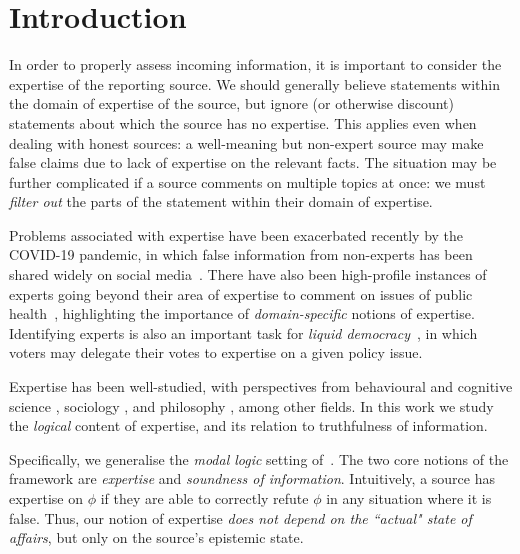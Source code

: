 \section{Introduction}

In order to properly assess incoming information, it is important to consider
the expertise of the reporting source. We should generally believe statements
within the domain of expertise of the source, but ignore (or otherwise
discount) statements about which the source has no expertise. This applies even
when dealing with honest sources: a well-meaning but non-expert source may make
false claims due to lack of expertise on the relevant facts.
%
The situation may be further complicated if a source comments on multiple
topics at once: we must \emph{filter out} the parts of the statement within
their domain of expertise.

Problems associated with expertise have been exacerbated recently by the
COVID-19 pandemic, in which false information from non-experts has been shared
widely on social media~\citep{Llewellynm1160,dijck2020}. There have also been
high-profile instances of experts going beyond their area of expertise to
comment on issues of public health~\citep{xaudiera2020ibuprofen}, highlighting
the importance of \emph{domain-specific} notions of expertise. Identifying
experts is also an important task for \emph{liquid
democracy}~\citep{blum2016liquid}, in which voters may delegate their votes to
expertise on a given policy issue.

Expertise has been well-studied, with perspectives from behavioural and
cognitive science \citep{chi2014nature,ericsson2010expertise}, sociology
\citep{collins2008rethinking}, and philosophy
\citep{kilov2021brittleness,whyte2010trust,goldman2018expertise}, among other
fields. In this work we study the \emph{logical} content of expertise, and its
relation to truthfulness of information.

Specifically, we generalise the \emph{modal logic} setting
of~\citet{singleton2021logic}. The two core notions of the framework are
\emph{expertise} and \emph{soundness of information}. Intuitively, a source has
expertise on $\phi$ if they are able to correctly refute $\phi$ in any
situation where it is false.\footnotemark{} Thus, our notion of expertise
\emph{does not depend on the ``actual" state of affairs}, but only on the
source's epistemic state.


